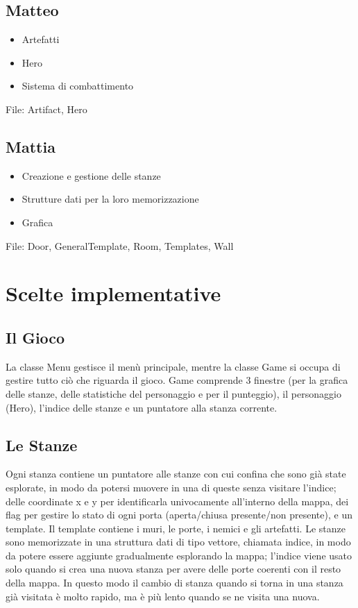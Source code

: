 \documentclass[12pt]{article}
\begin{document}
\subsection*{Matteo}
\begin{itemize}
    \item Artefatti
    \item Hero
    \item Sistema di combattimento
\end{itemize}
File: Artifact, Hero

\subsection*{Mattia}
\begin{itemize}
    \item Creazione e gestione delle stanze 
    \item Strutture dati per la loro memorizzazione
    \item Grafica
\end{itemize}
File: Door, GeneralTemplate, Room, Templates, Wall

\newpage
\section*{Scelte implementative}
\subsection*{Il Gioco}
La classe Menu gestisce il menù principale, mentre la classe Game si occupa di gestire tutto ciò che riguarda il gioco.
Game comprende 3 finestre (per la grafica delle stanze, delle statistiche del personaggio e per il punteggio), il personaggio (Hero), l'indice delle stanze e un puntatore alla stanza corrente.

\subsection*{Le Stanze}
Ogni stanza contiene un puntatore alle stanze con cui confina che sono già state esplorate, in modo da potersi muovere in una di queste senza visitare l'indice; delle coordinate x e y per identificarla univocamente all'interno della mappa, dei flag per gestire lo stato di ogni porta (aperta/chiusa presente/non presente), e un template. Il template contiene i muri, le porte, i nemici e gli artefatti. \hfill\break
Le stanze sono memorizzate in una struttura dati di tipo vettore, chiamata indice, in modo da potere essere aggiunte gradualmente esplorando la mappa; l'indice viene usato solo quando si crea una nuova stanza per avere delle porte coerenti con il resto della mappa.
In questo modo il cambio di stanza quando si torna in una stanza già visitata è molto rapido, ma è più lento quando se ne visita una nuova. 
\end{document}
